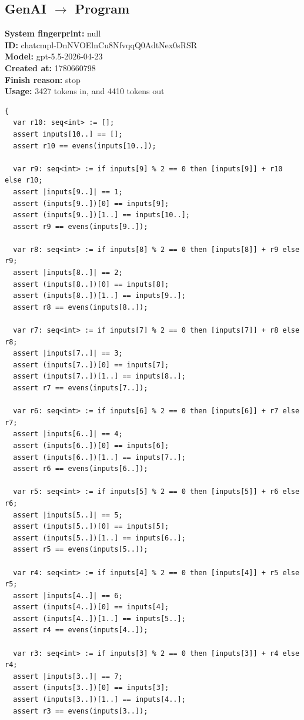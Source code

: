\documentclass{article}
\begin{document}
\subsection*{GenAI $\rightarrow$ Program}
\textbf{System fingerprint: }null
\\\textbf{ID: }chatcmpl-DnNVOElnCu8NfvqqQ0AdtNex0sRSR
\\\textbf{Model: }gpt-5.5-2026-04-23
\\\textbf{Created at: }1780660798
\\\textbf{Finish reason: }stop
\\\textbf{Usage: }3427 tokens in, and 4410 tokens out
\begin{lstlisting}
{
  var r10: seq<int> := [];
  assert inputs[10..] == [];
  assert r10 == evens(inputs[10..]);

  var r9: seq<int> := if inputs[9] % 2 == 0 then [inputs[9]] + r10 else r10;
  assert |inputs[9..]| == 1;
  assert (inputs[9..])[0] == inputs[9];
  assert (inputs[9..])[1..] == inputs[10..];
  assert r9 == evens(inputs[9..]);

  var r8: seq<int> := if inputs[8] % 2 == 0 then [inputs[8]] + r9 else r9;
  assert |inputs[8..]| == 2;
  assert (inputs[8..])[0] == inputs[8];
  assert (inputs[8..])[1..] == inputs[9..];
  assert r8 == evens(inputs[8..]);

  var r7: seq<int> := if inputs[7] % 2 == 0 then [inputs[7]] + r8 else r8;
  assert |inputs[7..]| == 3;
  assert (inputs[7..])[0] == inputs[7];
  assert (inputs[7..])[1..] == inputs[8..];
  assert r7 == evens(inputs[7..]);

  var r6: seq<int> := if inputs[6] % 2 == 0 then [inputs[6]] + r7 else r7;
  assert |inputs[6..]| == 4;
  assert (inputs[6..])[0] == inputs[6];
  assert (inputs[6..])[1..] == inputs[7..];
  assert r6 == evens(inputs[6..]);

  var r5: seq<int> := if inputs[5] % 2 == 0 then [inputs[5]] + r6 else r6;
  assert |inputs[5..]| == 5;
  assert (inputs[5..])[0] == inputs[5];
  assert (inputs[5..])[1..] == inputs[6..];
  assert r5 == evens(inputs[5..]);

  var r4: seq<int> := if inputs[4] % 2 == 0 then [inputs[4]] + r5 else r5;
  assert |inputs[4..]| == 6;
  assert (inputs[4..])[0] == inputs[4];
  assert (inputs[4..])[1..] == inputs[5..];
  assert r4 == evens(inputs[4..]);

  var r3: seq<int> := if inputs[3] % 2 == 0 then [inputs[3]] + r4 else r4;
  assert |inputs[3..]| == 7;
  assert (inputs[3..])[0] == inputs[3];
  assert (inputs[3..])[1..] == inputs[4..];
  assert r3 == evens(inputs[3..]);


\end{lstlisting}
\end{document}
